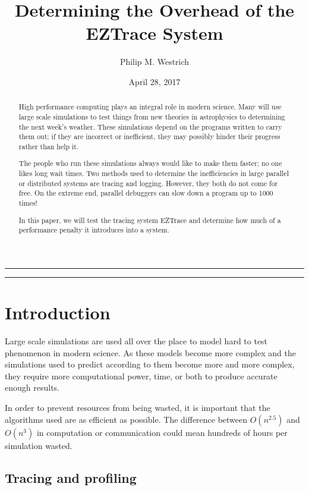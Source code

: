 \documentclass[12pt]{article}
\title{Determining the Overhead of the EZTrace System}
\author{Philip M. Westrich}
\date{April 28, 2017}
\begin{document}
\maketitle
\vspace{-0.3in}\noindent\rule{\linewidth}{0.4pt}
\doublespacing

\begin{abstract}

    High performance computing plays an integral role in modern science. Many will use large scale simulations to test 
    things from new theories in astrophysics to determining the next week's weather. These simulations depend on the 
    programs written to carry them out; if they are incorrect or inefficient, they may possibly hinder their progress 
    rather than help it.
    
    The people who run these simulations always would like to make them faster; no one likes long wait times. Two methods 
    used to determine the inefficiencies in large parallel or distributed systems are tracing and logging. However, they 
    both do not come for free. On the extreme end, parallel debuggers can slow down a program up to 1000 times!
    
    In this paper, we will test the tracing system EZTrace and determine how much of a performance penalty it introduces 
    into a system.\\
 
\end{abstract}

\vspace{-0.3in}\noindent\rule{\linewidth}{0.4pt}

\section{Introduction}

Large scale simulations are used all over the place to model hard to test phenomenon in modern science. As these models 
become more complex and the simulations used to predict according to them become more and more complex, they require more 
computational power, time, or both to produce accurate enough results.

In order to prevent resources from being wasted, it is important that the algorithms used are as efficient as possible. 
The difference between $ O(n^{2.5}) $ and $ O(n^3) $ in computation or communication could mean hundreds of hours per 
simulation wasted.

\subsection{Tracing and profiling}
\end{document}
